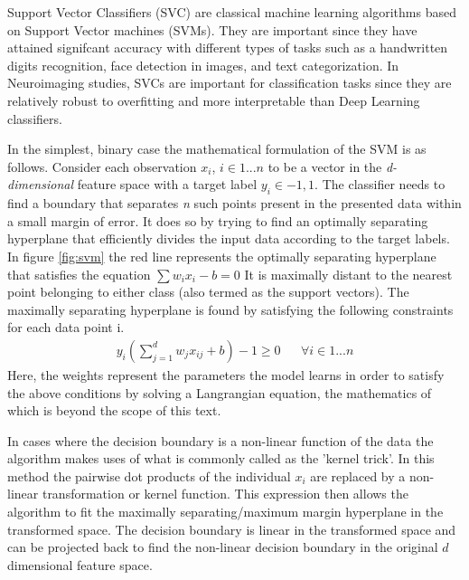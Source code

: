 \documentclass[msthesis.tex]{subfiles}
\begin{document}
Support Vector Classifiers (SVC) are classical machine learning algorithms based on Support Vector machines (SVMs). They are important since they have attained signifcant accuracy with different types of tasks such as a handwritten digits recognition, face detection in images, and text categorization\cite{burges1998a}. In Neuroimaging studies, SVCs are important for classification tasks since they are relatively robust to overfitting and more interpretable than Deep Learning classifiers.

In the simplest, binary case the mathematical formulation of the SVM is as follows. Consider each observation \textbf{$x_i$}, $i\in {1...n}$ to be a vector in the \textit{d-dimensional} feature space with a target label  $y_i\in {-1,1}$. The classifier needs to find a boundary that separates \textit{n} such points present in the presented data within a small margin of error.  It does so by trying to find an optimally separating hyperplane that efficiently divides the input data according to the target labels. In figure \ref{fig:svm} the red line represents the optimally separating hyperplane that satisfies the equation
$ \sum w_i x_i - b = 0$
 It is maximally distant to the nearest point belonging to either class (also termed as the support vectors). The maximally separating hyperplane is found by satisfying the following constraints for each data point i. 
\begin{align}
    y_i(\sum_{j=1}^{d} w_{j} x_{ij}  + b)  - 1\geq 0 && \forall i \in {1...n}
\end{align}
Here, the weights represent the parameters the model learns in order to satisfy the above conditions by solving a Langrangian equation, the mathematics of which is beyond the scope of this text.  

In cases where the decision boundary is a non-linear function of the data the algorithm makes uses of what is commonly called as the 'kernel trick'. In this method the pairwise dot products of the individual $x_i$ are replaced by a non-linear transformation or kernel function. This expression then allows the algorithm to fit the maximally separating/maximum margin hyperplane in the transformed space. The decision boundary is linear in the transformed space and can be projected back to find the non-linear decision boundary in the original $d$ dimensional feature space. 
\end{document}
